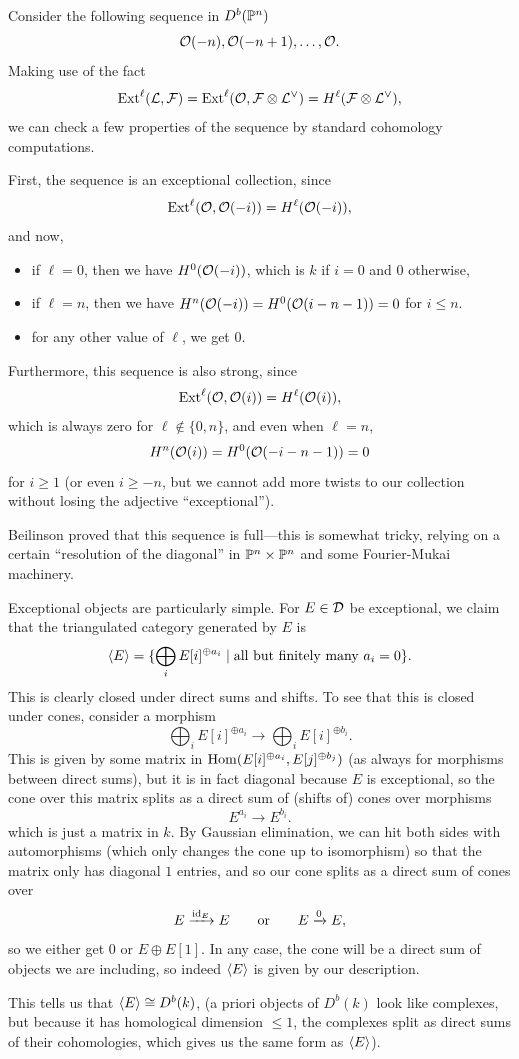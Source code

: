 \documentclass[12pt]{article}
\begin{document}
\begin{eg}
    Consider the following sequence in $D^b(\P^n)$
    \[\cO(-n),\cO(-n+1),\dots,\cO.\]
    Making use of the fact
    \[\Ext^\ell(\cL,\cF) = \Ext^\ell(\cO,\cF\otimes \cL^\vee) = H^\ell(\cF\otimes \cL^\vee),\]
    we can check a few properties of the sequence by standard cohomology computations.
    
    First, the sequence is an exceptional collection, since
    \[\Ext^\ell(\cO,\cO(-i)) = H^\ell(\cO(-i)),\]
    and now,
    \begin{itemize}
        \item if $\ell=0$, then we have $H^0(\cO(-i))$, which is $k$ if $i=0$ and $0$ otherwise,
        \item if $\ell=n$, then we have $H^n(\cO(-i)) = H^0(\cO(i-n-1)) = 0$ for $i\leq n$.
        \item for any other value of $\ell$, we get 0.
    \end{itemize}

    Furthermore, this sequence is also strong, since
    \[\Ext^\ell(\cO,\cO(i)) = H^\ell(\cO(i)),\]
    which is always zero for $\ell\not\in \{0,n\}$, and even when $\ell=n$,
    \[H^n(\cO(i)) = H^0(\cO(-i-n-1)) = 0\]
    for $i\geq 1$ (or even $i\geq -n$, but we cannot add more twists to our collection without losing the adjective ``exceptional'').

    Beilinson proved that this sequence is full---this is somewhat tricky, relying on a certain ``resolution of the diagonal'' in $\P^n\times\P^n$ and some Fourier-Mukai machinery.
\end{eg}

\begin{rmk}
    Exceptional objects are particularly simple. For $E\in \cD$ be exceptional, we claim that the triangulated category generated by $E$ is
    \[\<E\> = \{\bigoplus_i E[i]^{\oplus a_i} \mid \text{all but finitely many $a_i=0$}\}.\]
    This is clearly closed under direct sums and shifts. To see that this is closed under cones, consider a morphism
    \[\bigoplus_i E[i]^{\oplus a_i} \to \bigoplus_i E[i]^{\oplus b_i}.\]
    This is given by some matrix in $\Hom(E[i]^{\oplus a_i}, E[j]^{\oplus b_j})$ (as always for morphisms between direct sums), but it is in fact diagonal because $E$ is exceptional, so the cone over this matrix splits as a direct sum of (shifts of) cones over morphisms
    \[E^{a_i} \to E^{b_i}.\]
    which is just a matrix in $k$. By Gaussian elimination, we can hit both sides with automorphisms (which only changes the cone up to isomorphism) so that the matrix only has diagonal $1$ entries, and so our cone splits as a direct sum of cones over
    \[E \xrightarrow{\id_E} E \qquad \text{or} \qquad E \xrightarrow{0} E,\]
    so we either get $0$ or $E\oplus E[1]$. In any case, the cone will be a direct sum of objects we are including, so indeed $\<E\>$ is given by our description.

    This tells us that $\<E\> \cong D^b(k)$, (a priori objects of $D^b(k)$ look like complexes, but because it has homological dimension $\leq 1$, the complexes split as direct sums of their cohomologies, which gives us the same form as $\<E\>$).
\end{rmk}
\end{document}
